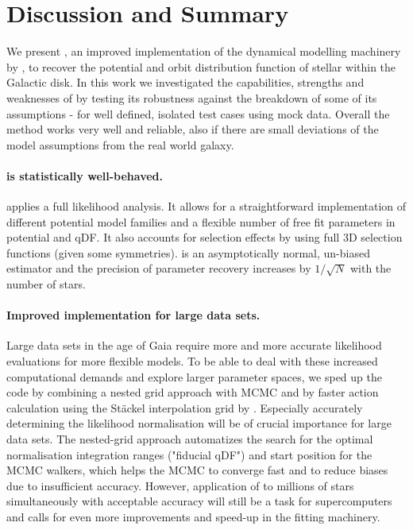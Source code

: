 \section{Discussion and Summary} \label{sec:discussionsummary}

We present \RM, an improved implementation of the dynamical modelling machinery by \citet{bov13}, to recover the potential and orbit distribution function of stellar \MAPs within the Galactic disk. In this work we investigated the capabilities, strengths and weaknesses of \RM by testing its robustness against the breakdown of some of its assumptions - for well defined, isolated test cases using mock data. Overall the method works very well and reliable, also if there are small deviations of the model assumptions from the real world galaxy.

\paragraph{\RM is statistically well-behaved.} \RM applies a full likelihood analysis. It allows for a straightforward implementation of different potential model families and a flexible number of free fit parameters in potential and qDF. It also accounts for selection effects by using full 3D selection functions (given some symmetries). \RM is an asymptotically normal, un-biased estimator and the precision of parameter recovery increases by $1/\sqrt{N}$ with the number of stars.

\paragraph{Improved implementation for large data sets.} Large data sets in the age of Gaia require more and more accurate likelihood evaluations for more flexible models. To be able to deal with these increased computational demands and explore larger parameter spaces, we sped up the code by combining a nested grid approach with MCMC and by faster action calculation using the St\"{a}ckel \citep{bin12} interpolation grid by \citet{bov15}. Especially accurately determining the likelihood normalisation will be of crucial importance for large data sets. The nested-grid approach automatizes the search for the optimal normalisation integration ranges ("fiducial qDF") and start position for the MCMC walkers, which helps the MCMC to converge fast and to reduce biases due to insufficient accuracy. However, application of \RM to millions of stars simultaneously with acceptable accuracy will still be a task for supercomputers and calls for even more improvements and speed-up in the fitting machinery.


